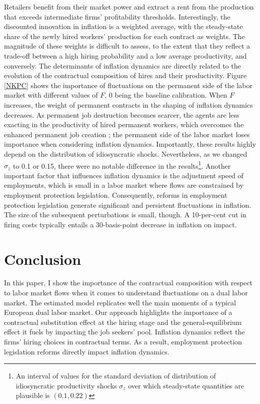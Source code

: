 \documentclass[a4paper]{article}
\begin{document}
Retailers benefit from their market power and extract a rent from the production that exceeds intermediate firms' profitability thresholds. Interestingly, the discounted innovation in inflation is a weighted average, with the steady-state share of the newly hired workers' production for each contract as weights. The magnitude of these weights is difficult to assess, to the extent that they reflect a trade-off between a high hiring probability and a low average productivity, and conversely. The determinants of inflation dynamics are directly related to the evolution of the contractual composition of hires and their productivity. Figure \ref{NKPC} shows the importance of fluctuations on the permanent side of the labor market with different values of $F$, 0 being the baseline calibration. When $F$ increases, the weight of permanent contracts in the shaping of inflation dynamics decreases. As permanent job destruction becomes scarcer, the agents are less exacting in the productivity of hired permanent workers, which overcomes the enhanced permanent job creation ; the permanent side of the labor market loses importance when considering inflation dynamics. Importantly, these results highly depend on the distribution of idiosyncratic shocks. Nevertheless, as we changed $\sigma_z$ to 0.1 or 0.15, there were no notable difference in the results\footnote{An interval of values for the standard deviation of distribution of idiosyncratic productivity shocks $\sigma_z$ over which steady-state quantities are plausible is $( 0.1 , 0.22 )$}. Another important factor that influences inflation dynamics is the adjustment speed of employments, which is small in a labor market where flows are constrained by employment protection legislation. Consequently, reforms in employment protection legislation generate significant and persistent fluctuations in inflation. The size of the subsequent perturbations is small, though. A 10-per-cent cut in firing costs typically entails a 30-basis-point decrease in inflation on impact.

\section{Conclusion}

In this paper, I show the importance of the contractual composition with respect to labor market flows when it comes to understand fluctuations on a dual labor market. The estimated model replicates well the main moments of a typical European dual labor market. Our approach highlights the importance of a contractual substitution effect at the hiring stage and the general-equilibrium effect it fuels by impacting the job seekers' pool. Inflation dynamics reflect the firms' hiring choices in contractual terms. As a result, employment protection legislation reforms directly impact inflation dynamics.
\end{document}
